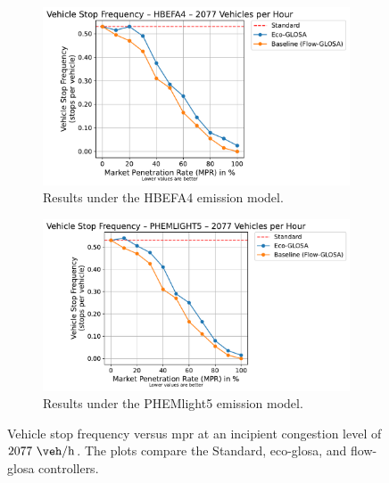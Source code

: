 \begin{figure}[htbp]
  \centering
  \begin{subfigure}[b]{0.98\textwidth}
    \includegraphics[width=\textwidth]{data/img/VehicleStopFrequency/VehicleStopFrequency_HBEFA4_Cars2077.pdf}
    \caption{Results under the HBEFA4 emission model.}
    \label{fig:StopFreq_2077_HBEFA4}
  \end{subfigure}
  \begin{subfigure}[b]{0.98\textwidth}
    \includegraphics[width=\textwidth]{data/img/VehicleStopFrequency/VehicleStopFrequency_PHEMLIGHT5_Cars2077.pdf}
    \caption{Results under the PHEMlight5 emission model.}
    \label{fig:StopFreq_2077_PHEM}
  \end{subfigure}
  \caption[Vehicle stop frequency vs. \ac{mpr} at $2077~\unit{\veh\per\hour}$]{Vehicle stop frequency versus \ac{mpr} at an incipient congestion level of $2077~\unit{\veh\per\hour}$. The plots compare the Standard, \ac{eco-glosa}, and \ac{flow-glosa} controllers.}
  \label{fig:StopFreq_2077}
\end{figure}

